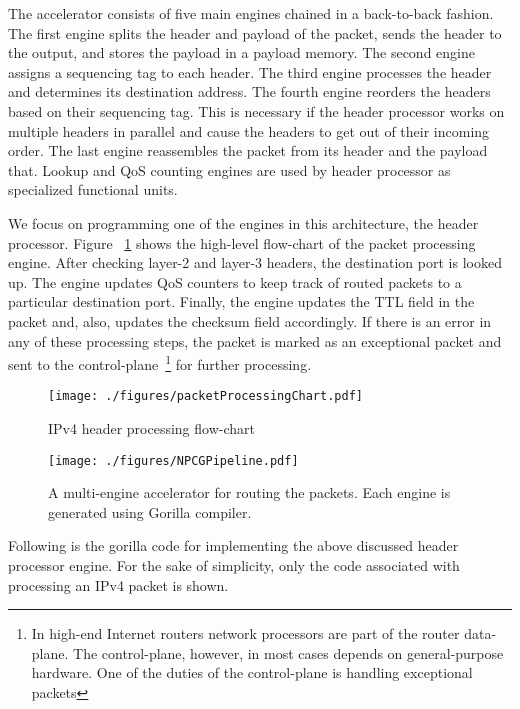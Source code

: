\documentclass[a4paper, 12pt]{report}
\begin{document}
The accelerator consists of five main engines chained 
in a back-to-back fashion. The first engine splits 
the header and payload of the packet, sends the header 
to the output, and stores the payload in a payload 
memory. The second engine assigns a sequencing tag to 
each header. The third engine processes the header and 
determines its destination address. The fourth engine 
reorders the headers based on their sequencing tag. 
This is necessary if the header processor works on 
multiple headers in parallel and cause the headers 
to get out of their incoming order. The last engine 
reassembles the packet from its header and the payload 
that. Lookup and QoS counting engines are used by header 
processor as specialized functional units.

We focus on programming one of the engines in this 
architecture, the header processor. Figure
~\ref{fig:packetProcessingChart} shows the high-level 
flow-chart of the packet processing engine. 
After checking layer-2 and layer-3 headers, the destination 
port is looked up. The engine updates QoS counters 
to keep track of routed packets to a particular destination 
port. Finally, the engine updates the TTL field in the 
packet and, also, updates the checksum field accordingly.
If there is an error in any of these processing steps, the 
packet is marked as an exceptional packet and sent to the 
control-plane~\footnote{In high-end Internet routers network 
processors are part of the router data-plane. The 
control-plane, however, in most cases depends on 
general-purpose hardware. One of the duties of the 
control-plane is handling exceptional packets} 
for further processing.
\begin{figure}
\begin{center}
  \texttt{[image: ./figures/packetProcessingChart.pdf]}
  \caption{IPv4 header processing flow-chart}
  \label{fig:packetProcessingChart}
\end{center}
\end{figure}

\begin{figure}
\begin{center}
  \texttt{[image: ./figures/NPCGPipeline.pdf]}
  \caption{A multi-engine accelerator for routing the packets. 
Each engine is generated using Gorilla compiler.}
  \label{fig:packetForwardingChain}
\end{center}
\end{figure}

Following is the gorilla code for implementing the above 
discussed header processor engine. For the sake of 
simplicity, only the code associated with 
processing an IPv4 packet is shown.
\end{document}
